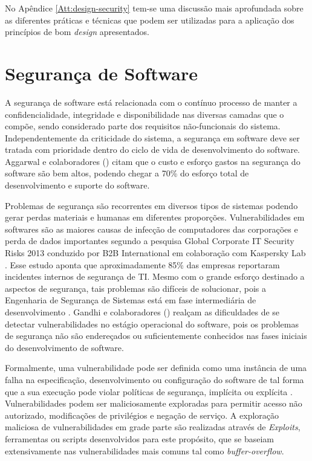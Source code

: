 No Apêndice \ref{Att:design-security} tem-se uma discussão mais aprofundada sobre as diferentes práticas e técnicas que podem ser utilizadas para a aplicação dos princípios de bom \emph{design} apresentados.


\section{Segurança de Software}
\label{sec-metrics-security}

A segurança de software está relacionada com o contínuo processo de manter a confidencialidade, integridade e disponibilidade nas diversas camadas que o compõe, sendo considerado parte dos requisitos não-funcionais do sistema. Independentemente da criticidade do sistema, a segurança em software deve ser tratada com prioridade dentro do ciclo de vida de desenvolvimento do software. Aggarwal e colaboradores (\citeyear{aggarwal2002}) citam que o custo e esforço gastos na segurança do software são bem altos, podendo chegar a 70\% do esforço total de desenvolvimento e suporte do software.

%

Problemas de segurança são recorrentes em diversos tipos de sistemas podendo gerar perdas materiais e humanas em diferentes proporções. Vulnerabilidades em softwares são as maiores causas de infecção de computadores das corporações e perda de dados importantes segundo a pesquisa Global Corporate IT Security Risks 2013 conduzido por B2B International em colaboração com Kaspersky Lab \cite{b2binternational2013}. Esse estudo aponta que aproximadamente 85\% das empresas reportaram incidentes internos de segurança de TI. Mesmo com o grande esforço destinado a aspectos de segurança, tais problemas são difíceis de solucionar, pois a Engenharia de Segurança de Sistemas está em fase intermediária de desenvolvimento \cite{pascoa2002}. Gandhi e colaboradores (\citeyear{gandhi2013}) realçam as dificuldades de se detectar vulnerabilidades no estágio operacional do software, pois os problemas de segurança não são endereçados ou suficientemente conhecidos nas fases iniciais do desenvolvimento de software.

%

Formalmente, uma vulnerabilidade pode ser definida como uma instância de uma falha na especificação, desenvolvimento ou configuração do software de tal forma que a sua execução pode violar políticas de segurança, implícita ou explícita \cite{krsul1998}. Vulnerabilidades podem ser maliciosamente exploradas para permitir acesso não autorizado, modificações de privilégios e negação de serviço. A exploração maliciosa de vulnerabilidades em grade parte são realizadas através de \emph{Exploits}, ferramentas ou scripts desenvolvidos para este propósito, que se baseiam extensivamente nas vulnerabilidades mais comuns tal como \emph{buffer-overflow}.


